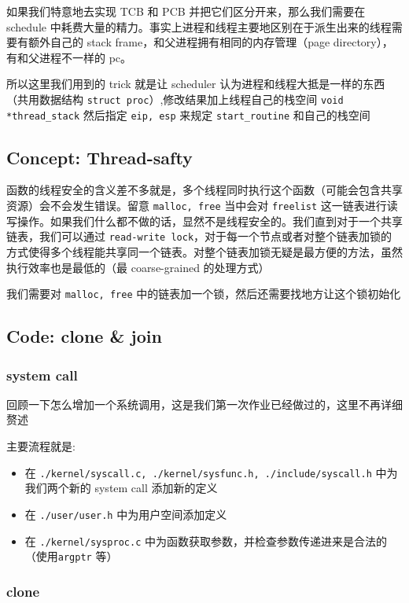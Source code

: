 如果我们特意地去实现 TCB 和 PCB 并把它们区分开来，那么我们需要在 schedule 中耗费大量的精力。事实上进程和线程主要地区别在于派生出来的线程需要有额外自己的 stack frame，和父进程拥有相同的内存管理（page directory），有和父进程不一样的 pc。

所以这里我们用到的 trick 就是让 scheduler 认为进程和线程大抵是一样的东西（共用数据结构 \texttt{struct proc}）,修改结果加上线程自己的栈空间 \texttt{void *thread\_stack} 然后指定 \texttt{eip, esp} 来规定 \texttt{start\_routine} 和自己的栈空间

\subsection{Concept: Thread-safty}

函数的线程安全的含义差不多就是，多个线程同时执行这个函数（可能会包含共享资源）会不会发生错误。留意 \texttt{malloc, free} 当中会对 \texttt{freelist} 这一链表进行读写操作。如果我们什么都不做的话，显然不是线程安全的。我们直到对于一个共享链表，我们可以通过 \texttt{read-write lock}，对于每一个节点或者对整个链表加锁的方式使得多个线程能共享同一个链表。对整个链表加锁无疑是最方便的方法，虽然执行效率也是最低的（最 coarse-grained 的处理方式）

我们需要对 \texttt{malloc, free} 中的链表加一个锁，然后还需要找地方让这个锁初始化


\subsection{Code: clone \& join}

\subsubsection{system call}

回顾一下怎么增加一个系统调用，这是我们第一次作业已经做过的，这里不再详细赘述

主要流程就是:

\begin{itemize}
    \item 在 \texttt{./kernel/syscall.c, ./kernel/sysfunc.h, ./include/syscall.h} 中为我们两个新的 system call 添加新的定义
    \item 在 \texttt{./user/user.h} 中为用户空间添加定义
    \item 在 \texttt{./kernel/sysproc.c} 中为函数获取参数，并检查参数传递进来是合法的（使用\texttt{argptr} 等）
\end{itemize}


\subsubsection{clone}

